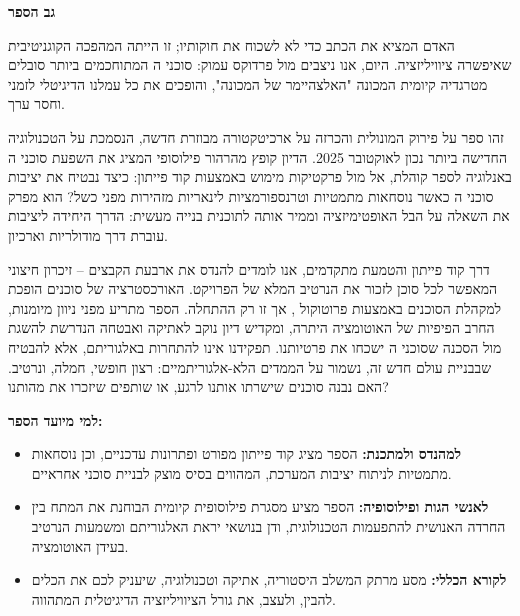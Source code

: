 \documentclass{hebrew-academic-template}
\begin{document}
\author{ד"ר יורם סגל}
\date{}
\newcommand{\version}{}
\maketitle
\vspace{-1em}
\begin{center}
\version
\end{center}

\newpage
\thispagestyle{empty}
\begin{center}
{\Large \textbf{גב הספר}}
\end{center}
\vspace{1em}

האדם המציא את הכתב כדי לא לשכוח את חוקותיו; זו הייתה המהפכה הקוגניטיבית שאיפשרה ציוויליזציה. היום, אנו ניצבים מול פרדוקס עמוק: סוכני ה המתוחכמים ביותר סובלים מטרגדיה קיומית המכונה "האלצהיימר של המכונה", והופכים את כל עמלנו הדיגיטלי לזמני וחסר ערך.

זהו ספר על פירוק המונולית והכרזה על ארכיטקטורה מבוזרת חדשה, הנסמכת על הטכנולוגיה החדישה ביותר נכון לאוקטובר \num{2025}. הדיון קופץ מהרהור פילוסופי המציג את השפעת סוכני ה באנלוגיה לספר קוהלת, אל מול פרקטיקות מימוש באמצעות קוד פייתון: כיצד נבטיח את יציבות סוכני ה כאשר נוסחאות מתמטיות וטרנספורמציות לינאריות מזהירות מפני כשל? הוא מפרק את השאלה על הבל האופטימיזציה וממיר אותה לתוכנית בנייה מעשית: הדרך היחידה ליציבות עוברת דרך מודולריות וארכיון.

דרך קוד פייתון והטמעת  מתקדמים, אנו לומדים להנדס את ארבעת הקבצים – זיכרון חיצוני המאפשר לכל סוכן לזכור את הנרטיב המלא של הפרויקט. האורכסטרציה של סוכנים הופכת למקהלת הסוכנים באמצעות פרוטוקול , אך זו רק ההתחלה. הספר מתריע מפני ניוון מיומנות, החרב הפיפיות של האוטומציה היתרה, ומקדיש דיון נוקב לאתיקה ואבטחה הנדרשת להשגת  מול הסכנה שסוכני ה ישכחו את פרטיותנו. תפקידנו אינו להתחרות באלגוריתם, אלא להבטיח שבבניית עולם חדש זה, נשמור על הממדים הלא-אלגוריתמיים: רצון חופשי, חמלה, ונרטיב. האם נבנה סוכנים שישרתו אותנו לרגע, או שותפים שיזכרו את מהותנו?

\textbf{למי מיועד הספר:}

\begin{itemize}
\item \textbf{למהנדס ולמתכנת:} הספר מציג קוד פייתון מפורט ופתרונות  עדכניים, וכן נוסחאות מתמטיות לניתוח יציבות המערכת, המהווים בסיס מוצק לבניית סוכני  אחראיים.
\item \textbf{לאנשי הגות ופילוסופיה:} הספר מציע מסגרת פילוסופית קיומית הבוחנת את המתח בין החרדה האנושית להתפעמות הטכנולוגית, ודן בנושאי יראת האלגוריתם ומשמעות הנרטיב בעידן האוטומציה.
\item \textbf{לקורא הכללי:} מסע מרתק המשלב היסטוריה, אתיקה וטכנולוגיה, שיעניק לכם את הכלים להבין, ולעצב, את גורל הציוויליזציה הדיגיטלית המתהווה.
\end{itemize}
\end{document}
